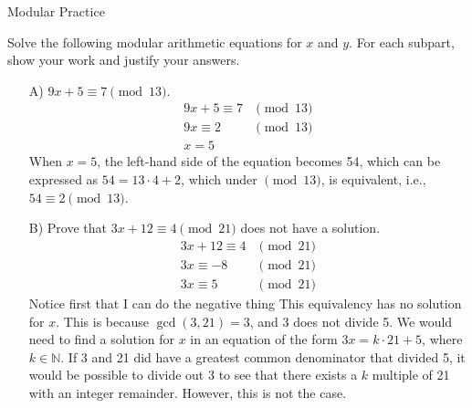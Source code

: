 \begin{homeworkProblem}{Modular Practice}

    Solve the following modular arithmetic equations for $x$ and $y$. For each 
    subpart, show your work and justify your answers.

    \begin{itemize}
        \item[A)] $9x+5 \equiv 7 \pmod{13}$.
        \[
            \begin{split}      
                9x + 5 \equiv 7 & \pmod{13} \\
                9x \equiv 2 & \pmod{13} \\
                x = 5 &
            \end{split}
        \]
        When $x = 5$, the left-hand side of the equation becomes 54, which can be 
        expressed as $54 = 13 \cdot 4 + 2$, which under $\pmod{13}$, is equivalent,
        i.e., $54 \equiv 2 \pmod{13}$.

        \item[B)] Prove that $3x+12 \equiv 4 \pmod{21}$ does not have a solution.
        \[
            \begin{split}
                3x + 12 \equiv 4 & \pmod{21} \\
                3x \equiv -8 & \pmod{21} \\
                3x \equiv 5 & \pmod{21}
            \end{split}
        \]
        Notice first that I can do the negative thing 
        This equivalency has no solution for $x$. This is because $\gcd(3, 21) = 3$,
        and 3 does not divide 5. We would need to find a solution for $x$ in an 
        equation of the form $3x = k \cdot 21 + 5$, where $k \in \mathbb{N}$. If 3
        and 21 did have a greatest common denominator that divided 5, it would be 
        possible to divide out 3 to see that there exists a $k$ multiple of 21 with
        an integer remainder. However, this is not the case. 


\end{itemize}
\end{homeworkProblem}

